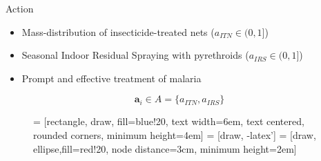 \documentclass[10pt,usenames,dvipsnames]{beamer}
\begin{document}
\begin{frame}{Action}

\begin{itemize}
\item Mass-distribution of insecticide-treated nets ($a_{ITN} \in (0,1]$)
\item Seasonal Indoor Residual Spraying with pyrethroids ($a_{IRS}\in (0,1]$)
\item Prompt and effective treatment of malaria  \cite{Stuckey2014}
\end{itemize}
\begin{equation}
\bm{a}_i \in A = \{a_{ITN}, a_{IRS}\}
\end{equation}

\begin{figure}[!t]
\centering
{} = [rectangle, draw, fill=blue!20, 
    text width=6em, text centered, rounded corners, minimum height=4em]
 = [draw, -latex']
 = [draw, ellipse,fill=red!20, node distance=3cm,
    minimum height=2em]
    
\label{fig_flow}
\end{figure}

\end{frame}
\end{document}

